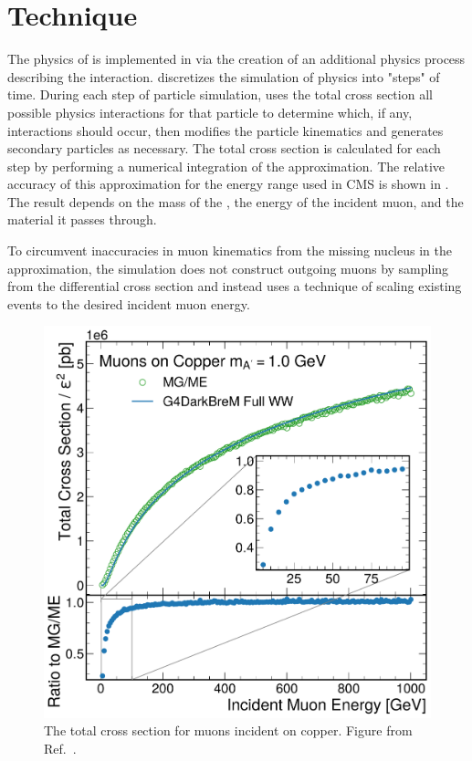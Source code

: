 \section{Technique}
\label{sec:technique}

The physics of \dbrem is implemented in \gf via the creation of an additional physics process describing the interaction. 
\gf discretizes the simulation of physics into "steps" of time. 
During each step of particle simulation, \gf uses the total cross section all possible physics interactions for that particle to determine which, if any, interactions should occur, then modifies the particle kinematics and generates secondary particles as necessary. 
The total cross section is calculated for each step by performing a numerical integration of the \ww approximation.
The relative accuracy of this approximation for the energy range used in CMS is shown in .
The result depends on the mass of the \aprime,  the energy of the incident muon, and the material it passes through. 

To circumvent inaccuracies in muon kinematics from the missing nucleus in the \ww approximation, the simulation does not construct outgoing muons by sampling from the differential \ww cross section and instead uses a technique of scaling existing \mg events to the desired incident muon energy. 

\begin{figure}[!htbp]
    \centering
    \includegraphics[width=\textwidth]{figures/mu_xsec.pdf}
    \caption[
        The \dbrem cross section.
    ]{
	    The total \dbrem cross section for muons incident on copper. Figure from Ref.~\cite{Eichlersmith_2023}.
    }
    \label{fig:mu_xsec}
\end{figure}

